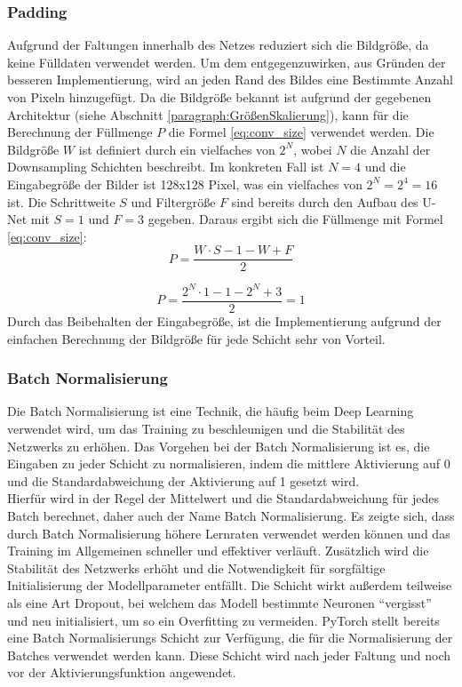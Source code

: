 \subsubsection{Padding}
Aufgrund der Faltungen innerhalb des Netzes reduziert sich die Bildgröße, da keine Fülldaten verwendet werden. Um dem entgegenzuwirken, aus Gründen der besseren Implementierung, wird an jeden Rand des Bildes eine Bestimmte Anzahl von Pixeln hinzugefügt. Da die Bildgröße bekannt ist aufgrund der gegebenen Architektur (siehe Abschnitt \ref{paragraph:GrößenSkalierung}), kann für die Berechnung der Füllmenge $P$ die Formel \ref{eq:conv_size} verwendet werden. Die Bildgröße $W$ ist definiert durch ein vielfaches von $2^N$, wobei $N$ die Anzahl der Downsampling Schichten beschreibt. Im konkreten Fall ist $N=4$ und die Eingabegröße der Bilder ist 128x128 Pixel, was ein vielfaches von $2^N=2^4=16$ ist. Die Schrittweite $S$ und Filtergröße $F$ sind bereits durch den Aufbau des U-Net mit $S=1$ und $F=3$ gegeben. Daraus ergibt sich die Füllmenge mit Formel \ref{eq:conv_size}:
\begin{equation}
	P = \dfrac{W \cdot S - 1 - W + F}{2}
\end{equation}

\begin{equation}
	P = \dfrac{2^N \cdot 1 - 1 - 2^N + 3}{2}  = 1
\end{equation}
Durch das Beibehalten der Eingabegröße, ist die Implementierung aufgrund der einfachen Berechnung der Bildgröße für jede Schicht sehr von Vorteil. 

\subsubsection{Batch Normalisierung}
Die Batch Normalisierung ist eine Technik, die häufig beim Deep Learning verwendet wird, um das Training zu beschleunigen und die Stabilität des Netzwerks zu erhöhen. Das Vorgehen bei der Batch Normalisierung ist es, die Eingaben zu jeder Schicht zu normalisieren, indem die mittlere Aktivierung auf 0 und die Standardabweichung der Aktivierung auf 1 gesetzt wird.\\
Hierfür wird in der Regel der Mittelwert und die Standardabweichung für jedes Batch berechnet, daher auch der Name Batch Normalisierung. Es zeigte sich, dass durch Batch Normalisierung höhere Lernraten verwendet werden können und das Training im Allgemeinen schneller und effektiver verläuft. Zusätzlich wird die Stabilität des Netzwerks erhöht und die Notwendigkeit für sorgfältige Initialisierung der Modellparameter entfällt. Die Schicht wirkt außerdem teilweise als eine Art Dropout, bei welchem das Modell bestimmte Neuronen ``vergisst'' und neu initialisiert, um so ein Overfitting zu vermeiden.\cite[vgl.][]{Ioffe2015}
PyTorch stellt bereits eine Batch Normalisierungs Schicht zur Verfügung, die für die Normalisierung der Batches verwendet werden kann. Diese Schicht wird nach jeder Faltung und noch vor der Aktivierungsfunktion angewendet.

